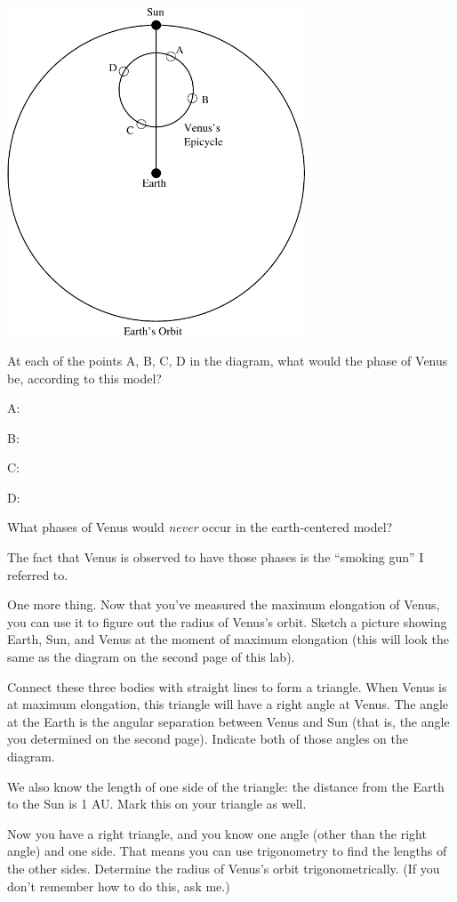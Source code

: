 \vspace{0.2in}
\centerline{\includegraphics[width=3.5in]{phasesofvenus/venus2.pdf}}
\vspace{0.2in}


At each of the points A, B, C, D in the diagram, what would the phase
of Venus be, according to this model?

A:

B:

C: 

D:

What phases of Venus would {\it never} occur in the earth-centered
model?

\answerspace{1in}

The fact that Venus is observed to have those phases is the ``smoking
gun'' I referred to.

\pagebreak[3]

One more thing.  Now that you've measured the maximum elongation of
Venus, you can use it to figure out the radius of Venus's orbit.
Sketch a picture showing Earth, Sun, and Venus at the moment of 
maximum elongation (this will look the same as the diagram on the
second page of this lab).  

\answerspace{ 2in}

Connect these three bodies with straight lines to form a triangle.
When Venus is at maximum elongation, this triangle will have a right
angle at Venus.  The angle at the Earth is the angular separation
between Venus and Sun (that is, the angle you determined on the second page).
Indicate both of those angles on the diagram.

We also know the length of one side of the triangle: the distance from
the Earth to the Sun is 1 AU.  Mark this on your triangle as well.

Now you have a right triangle, and you know one angle (other
than the right angle) and one side.
That means you can use trigonometry to find the lengths of the
other sides.  Determine the radius of Venus's orbit trigonometrically.
(If you don't remember how to do this, ask me.)



